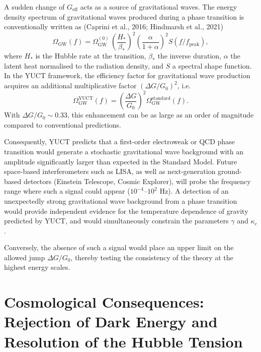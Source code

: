 \documentclass[12pt]{article}
\theoremstyle{remark}
\begin{document}
	A sudden change of $G_{\mathrm{eff}}$ acts as a source of gravitational waves. 
	The energy density spectrum of gravitational waves produced during a phase 
	transition is conventionally written as (Caprini et al., 2016; Hindmarsh et al., 
	2021)
	\begin{equation}
		\Omega_{\mathrm{GW}}(f) = \Omega_{\mathrm{GW}}^{(0)} \,
		\left(\frac{H_*}{\beta_*}\right)^2 \left(\frac{\alpha}{1+\alpha}\right)^2 
		S(f/f_{\mathrm{peak}}),
	\end{equation}
	where $H_*$ is the Hubble rate at the transition, $\beta_*$ the inverse duration,
	$\alpha$ the latent heat normalised to the radiation density, and $S$ a spectral
	shape function. In the YUCT framework, the efficiency factor for gravitational
	wave production acquires an additional multiplicative factor 
	$(\Delta G/G_0)^2$, i.e.
	\begin{equation}
		\Omega_{\mathrm{GW}}^{\mathrm{YUCT}}(f) = \left(\frac{\Delta G}{G_0}\right)^2 
		\Omega_{\mathrm{GW}}^{\mathrm{standard}}(f).
	\end{equation}
	With $\Delta G/G_0\sim 0.33$, this enhancement can be as large as an order of
	magnitude compared to conventional predictions.
	
	Consequently, YUCT predicts that a first-order electroweak or QCD phase 
	transition would generate a stochastic gravitational wave background with an 
	amplitude significantly larger than expected in the Standard Model. 
	Future space-based interferometers such as LISA, as well as next-generation 
	ground-based detectors (Einstein Telescope, Cosmic Explorer), will probe the 
	frequency range where such a signal could appear ($10^{-4}$--$10^{2}$ Hz). 
	A detection of an unexpectedly strong gravitational wave background from a 
	phase transition would provide independent evidence for the temperature 
	dependence of gravity predicted by YUCT, and would simultaneously constrain 
	the parameters $\gamma$ and $\kappa_c$.
	
	Conversely, the absence of such a signal would place an upper limit on the 
	allowed jump $\Delta G/G_0$, thereby testing the consistency of the theory 
	at the highest energy scales.
	
	\section{Cosmological Consequences: Rejection of Dark Energy and Resolution of the Hubble Tension}
	\label{sec:cosmo-consequences}
	
\end{document}
